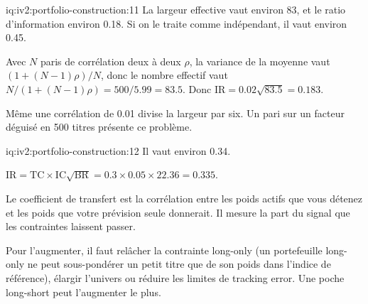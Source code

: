 \begin{solution}{iq:iv2:portfolio-construction:11}
La largeur effective vaut environ 83, et le ratio d'information environ 0.18. Si on le traite comme indépendant, il vaut environ 0.45.

Avec $N$ paris de corrélation deux à deux $\rho$, la variance de la moyenne vaut $(1 + (N - 1)\rho)/N$, donc le nombre effectif vaut $N/(1 + (N - 1)\rho) = 500/5.99 = 83.5$. Donc $\mathrm{IR} = 0.02\sqrt{83.5} = 0.183$.

Même une corrélation de 0.01 divise la largeur par six. Un pari sur un facteur déguisé en 500 titres présente ce problème.

\end{solution}

\begin{solution}{iq:iv2:portfolio-construction:12}
Il vaut environ 0.34.

$\mathrm{IR} = \mathrm{TC} \times \mathrm{IC}\sqrt{\mathrm{BR}} = 0.3 \times 0.05 \times 22.36 = 0.335$.

Le coefficient de transfert est la corrélation entre les poids actifs que vous détenez et les poids que votre prévision seule donnerait. Il mesure la part du signal que les contraintes laissent passer.

Pour l'augmenter, il faut relâcher la contrainte long-only (un portefeuille long-only ne peut sous-pondérer un petit titre que de son poids dans l'indice de référence), élargir l'univers ou réduire les limites de tracking error. Une poche long-short peut l'augmenter le plus.

\end{solution}

